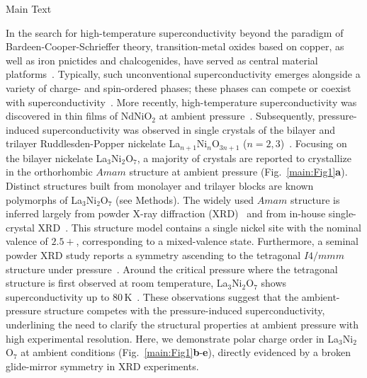 \documentclass[aps,12pt,floatfix,longbibliography,a4paper]{revtex4-2}
\newcommand{\LNO}{La$_3$Ni$_2$O$_7$}
\begin{document}
\newpage

\begin{center}
\Large{Main Text}
\end{center}
In the search for high-temperature superconductivity beyond the paradigm of Bardeen-Cooper-Schrieffer theory, transition-metal oxides based on copper, as well as iron pnictides and chalcogenides, have served as central material platforms~\cite{Keimer2015-zv,Stewart2011-qs,Fernandes2022-gu}. Typically, such unconventional superconductivity emerges alongside a variety of charge- and spin-ordered phases; these phases can compete or coexist with superconductivity~\cite{Keimer2015-zv,Fradkin2015-px}. More recently, high-temperature superconductivity was discovered in thin films of NdNiO$_2$ at ambient pressure~\cite{Li2019-jv}. Subsequently, pressure-induced superconductivity was observed in single crystals of the bilayer and trilayer Ruddlesden-Popper nickelate La$_{n+1}$Ni$_{n}$O$_{3n+1}$ ($n=2,3$)~\cite{Sun2023-sf,Zhang2024-uu,Zhu2024-rn}. Focusing on the bilayer nickelate \LNO{}, a majority of crystals are reported to crystallize in the orthorhombic $Amam$ structure at ambient pressure (Fig.~\ref{main:Fig1}\textbf{a}). Distinct structures built from monolayer and trilayer blocks are known polymorphs of \LNO{} (see Methods). The widely used $Amam$ structure is inferred largely from powder X-ray diffraction (XRD)~\cite{Zhang1994-vm,Taniguchi1995-lg,Ling2000-uz,Voronin2001-oc,Wang2024-qi} and from in-house single-crystal XRD~\cite{Wang2025-tg,Chen2024-dr,Wang2024-ii}. This structure model contains a single nickel site with the nominal valence of $2.5+$, corresponding to a mixed-valence state. Furthermore, a seminal powder XRD study reports a symmetry ascending to the tetragonal $I4/mmm$ structure under pressure~\cite{Wang2024-qi}. Around the critical pressure where the tetragonal structure is first observed at room temperature, La$_3$Ni$_2$O$_7$ shows superconductivity up to $80\,$K~\cite{Sun2023-sf,Zhang2024-uu}. These observations suggest that the ambient-pressure structure competes with the pressure-induced superconductivity, underlining the need to clarify the structural properties at ambient pressure with high experimental resolution. Here, we demonstrate polar charge order in \LNO{} at ambient conditions (Fig.~\ref{main:Fig1}\textbf{b}-\textbf{e}), directly evidenced by a broken glide-mirror symmetry in XRD experiments.
\end{document}
